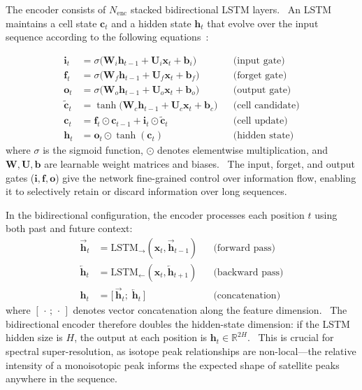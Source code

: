 \documentclass[12pt,a4paper]{report}
\begin{document}
The encoder consists of $N_{\mathrm{enc}}$ stacked bidirectional LSTM layers.  An LSTM maintains a cell state $\mathbf{c}_t$ and a hidden state $\mathbf{h}_t$ that evolve over the input sequence according to the following equations~\cite{lstm}:

\begin{align}
\mathbf{i}_t &= \sigma\!\big( \mathbf{W}_i \mathbf{h}_{t-1} + \mathbf{U}_i \mathbf{x}_t + \mathbf{b}_i \big) && \text{(input gate)} \label{eq:lstm_i} \\
\mathbf{f}_t &= \sigma\!\big( \mathbf{W}_f \mathbf{h}_{t-1} + \mathbf{U}_f \mathbf{x}_t + \mathbf{b}_f \big) && \text{(forget gate)} \label{eq:lstm_f} \\
\mathbf{o}_t &= \sigma\!\big( \mathbf{W}_o \mathbf{h}_{t-1} + \mathbf{U}_o \mathbf{x}_t + \mathbf{b}_o \big) && \text{(output gate)} \label{eq:lstm_o} \\
\tilde{\mathbf{c}}_t &= \tanh\!\big( \mathbf{W}_c \mathbf{h}_{t-1} + \mathbf{U}_c \mathbf{x}_t + \mathbf{b}_c \big) && \text{(cell candidate)} \label{eq:lstm_c} \\
\mathbf{c}_t &= \mathbf{f}_t \odot \mathbf{c}_{t-1} + \mathbf{i}_t \odot \tilde{\mathbf{c}}_t && \text{(cell update)} \label{eq:lstm_cell} \\
\mathbf{h}_t &= \mathbf{o}_t \odot \tanh(\mathbf{c}_t) && \text{(hidden state)} \label{eq:lstm_h}
\end{align}
where $\sigma$ is the sigmoid function, $\odot$ denotes elementwise multiplication, and $\mathbf{W}, \mathbf{U}, \mathbf{b}$ are learnable weight matrices and biases.  The input, forget, and output gates ($\mathbf{i}, \mathbf{f}, \mathbf{o}$) give the network fine-grained control over information flow, enabling it to selectively retain or discard information over long sequences.

In the bidirectional configuration, the encoder processes each position $t$ using both past and future context:
\begin{align}
\overrightarrow{\mathbf{h}}_t &= \text{LSTM}_{\!\rightarrow}(\mathbf{x}_t, \overrightarrow{\mathbf{h}}_{t-1}) && \text{(forward pass)} \label{eq:bilstm_fwd} \\
\overleftarrow{\mathbf{h}}_t &= \text{LSTM}_{\!\leftarrow}(\mathbf{x}_t, \overleftarrow{\mathbf{h}}_{t+1}) && \text{(backward pass)} \label{eq:bilstm_bwd} \\
\mathbf{h}_t &= \big[\, \overrightarrow{\mathbf{h}}_t ;\; \overleftarrow{\mathbf{h}}_t \,\big] && \text{(concatenation)} \label{eq:bilstm_cat}
\end{align}
where $[\,\cdot\,;\,\cdot\,]$ denotes vector concatenation along the feature dimension.  The bidirectional encoder therefore doubles the hidden-state dimension: if the LSTM hidden size is $H$, the output at each position is $\mathbf{h}_t \in \mathbb{R}^{2H}$.  This is crucial for spectral super-resolution, as isotope peak relationships are non-local---the relative intensity of a monoisotopic peak informs the expected shape of satellite peaks anywhere in the sequence.
\end{document}
